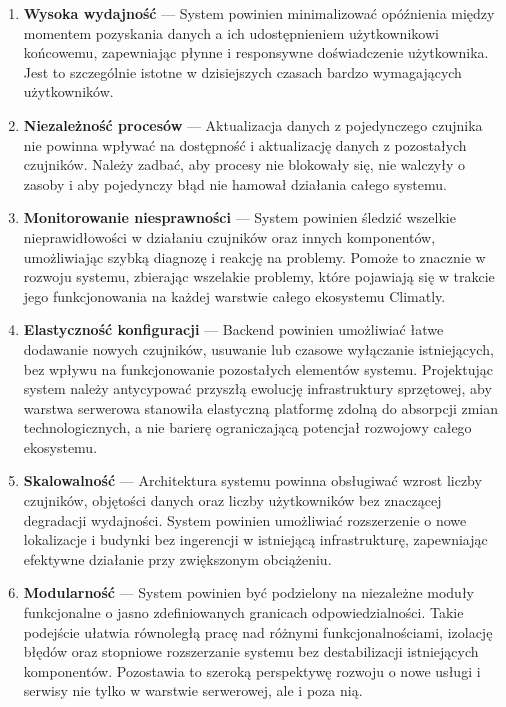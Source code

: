 \documentclass[a4paper,12pt,openany]{book}
\begin{document}
\begin{enumerate}
  \item \textbf{Wysoka wydajność} --- System powinien minimalizować opóźnienia między momentem pozyskania danych a ich udostępnieniem użytkownikowi końcowemu, zapewniając płynne i responsywne doświadczenie użytkownika. Jest to szczególnie istotne w dzisiejszych czasach bardzo wymagających użytkowników.

  \item \textbf{Niezależność procesów} --- Aktualizacja danych z pojedynczego czujnika nie powinna wpływać na dostępność i aktualizację danych z pozostałych czujników. Należy zadbać, aby procesy nie blokowały się, nie walczyły o zasoby i aby pojedynczy błąd nie hamował działania całego systemu.

  \item \textbf{Monitorowanie niesprawności} --- System powinien śledzić wszelkie nieprawidłowości w działaniu czujników oraz innych komponentów, umożliwiając szybką diagnozę i reakcję na problemy. Pomoże to znacznie w rozwoju systemu, zbierając wszelakie problemy, które pojawiają się w trakcie jego funkcjonowania na każdej warstwie całego ekosystemu Climatly.

  \item \textbf{Elastyczność konfiguracji} --- Backend powinien umożliwiać łatwe dodawanie nowych czujników, usuwanie lub czasowe wyłączanie istniejących, bez wpływu na funkcjonowanie pozostałych elementów systemu. Projektując system należy antycypować przyszłą ewolucję infrastruktury sprzętowej, aby warstwa serwerowa stanowiła elastyczną platformę zdolną do absorpcji zmian technologicznych, a nie barierę ograniczającą potencjał rozwojowy całego ekosystemu.

  \item \textbf{Skalowalność} --- Architektura systemu powinna obsługiwać wzrost liczby czujników, objętości danych oraz liczby użytkowników bez znaczącej degradacji wydajności. System powinien umożliwiać rozszerzenie o nowe lokalizacje i budynki bez ingerencji w istniejącą infrastrukturę, zapewniając efektywne działanie przy zwiększonym obciążeniu.

  \item \textbf{Modularność} --- System powinien być podzielony na niezależne moduły funkcjonalne o jasno zdefiniowanych granicach odpowiedzialności. Takie podejście ułatwia równoległą pracę nad różnymi funkcjonalnościami, izolację błędów oraz stopniowe rozszerzanie systemu bez destabilizacji istniejących komponentów. Pozostawia to szeroką perspektywę rozwoju o nowe usługi i serwisy nie tylko w warstwie serwerowej, ale i poza nią.
\end{enumerate}
\end{document}

